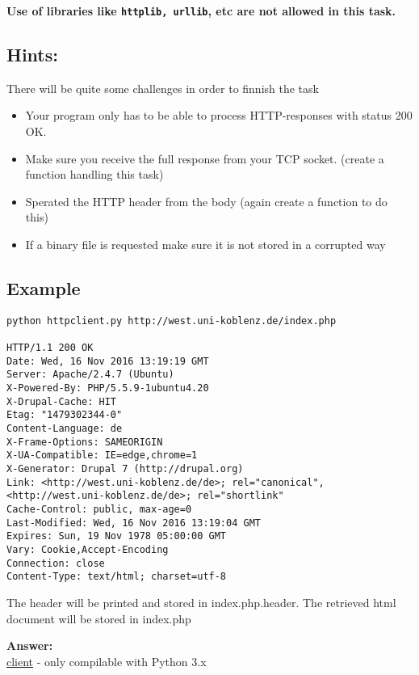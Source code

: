 \documentclass{WeSTassignment}
\begin{document}
\textbf{Use of libraries like \texttt{httplib, urllib}, etc are not allowed in this task.}

\subsection{Hints:}
There will be quite some challenges in order to finnish the task
\begin{itemize}
\item Your program only has to be able to process HTTP-responses with status 200 OK.
\item Make sure you receive the full response from your TCP socket. (create a function handling this task)
\item Sperated the HTTP header from the body (again create a function to do this)
\item If a binary file is requested make sure it is not stored in a corrupted way
\end{itemize}


\subsection{Example}
\begin{lstlisting}
python httpclient.py http://west.uni-koblenz.de/index.php

HTTP/1.1 200 OK
Date: Wed, 16 Nov 2016 13:19:19 GMT
Server: Apache/2.4.7 (Ubuntu)
X-Powered-By: PHP/5.5.9-1ubuntu4.20
X-Drupal-Cache: HIT
Etag: "1479302344-0"
Content-Language: de
X-Frame-Options: SAMEORIGIN
X-UA-Compatible: IE=edge,chrome=1
X-Generator: Drupal 7 (http://drupal.org)
Link: <http://west.uni-koblenz.de/de>; rel="canonical",<http://west.uni-koblenz.de/de>; rel="shortlink"
Cache-Control: public, max-age=0
Last-Modified: Wed, 16 Nov 2016 13:19:04 GMT
Expires: Sun, 19 Nov 1978 05:00:00 GMT
Vary: Cookie,Accept-Encoding
Connection: close
Content-Type: text/html; charset=utf-8

\end{lstlisting}
The header will be printed and stored in index.php.header. The retrieved html document will be stored in index.php

\textbf{Answer:} \\
\underline{client} - only compilable with Python 3.x\\





\end{document}
